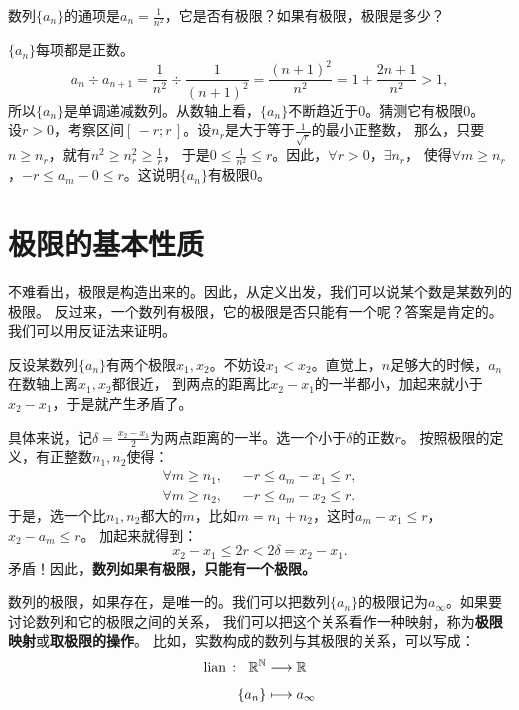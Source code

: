 \documentclass[12pt,UTF8]{ctexbook}
\begin{document}
\begin{et}
数列$\{a_n\}$的通项是$\displaystyle a_n = \frac{1}{n^2}$，它是否有极限？如果有极限，极限是多少？    
\end{et}
\begin{so}
    $\{a_n\}$每项都是正数。
    $$a_{n} \div a_{n+1} = \frac{1}{n^2} \div \frac{1}{(n+1)^2} = \frac{(n+1)^2}{n^2} = 1 + \frac{2n+1}{n^2} > 1,$$
    所以$\{a_n\}$是单调递减数列。从数轴上看，$\{a_n\}$不断趋近于$0$。猜测它有极限$0$。\\
    设$r>0$，考察区间$[\,-r;r\,]$。设$n_r$是大于等于$\frac{1}{\sqrt{r}}$的最小正整数，
    那么，只要$n \geqslant n_r$，就有$n^2 \geqslant n_r^2 \geqslant \frac{1}{r}$，
    于是$0 \leqslant \frac{1}{n^2} \leqslant r$。因此，$\forall r > 0$，$\exists n_r$，
    使得$\forall m \geqslant n_r$，$ -r  \leqslant a_m - 0 \leqslant r$。这说明$\{a_n\}$有极限$0$。    
\end{so}

\section{极限的基本性质}
不难看出，极限是构造出来的。因此，从定义出发，我们可以说某个数是某数列的极限。
反过来，一个数列有极限，它的极限是否只能有一个呢？答案是肯定的。我们可以用反证法来证明。

反设某数列$\{a_n\}$有两个极限$x_1, x_2$。不妨设$x_1 < x_2$。直觉上，$n$足够大的时候，$a_n$在数轴上离$x_1, x_2$都很近，
到两点的距离比$x_2 - x_1$的一半都小，加起来就小于$x_2 - x_1$，于是就产生矛盾了。

具体来说，记$\delta = \frac{x_2 - x_1}{2}$为两点距离的一半。选一个小于$\delta$的正数$r$。
按照极限的定义，有正整数$n_1, n_2$使得：
\begin{align*}
    \forall m \geqslant n_1 , \;\,\,& -r \leqslant a_m - x_1 \leqslant r ,  \\
    \forall m \geqslant n_2 , \;\,\,& -r \leqslant a_m - x_2 \leqslant r .  
\end{align*}
于是，选一个比$n_1,n_2$都大的$m$，比如$m=n_1+n_2$，这时$a_m - x_1 \leqslant r$，$x_2 - a_m \leqslant r$。
加起来就得到：
$$x_2 - x_1 \leqslant 2r < 2\delta = x_2 - x_1.$$
矛盾！因此，\textbf{数列如果有极限，只能有一个极限。}

数列的极限，如果存在，是唯一的。我们可以把数列$\{a_n\}$的极限记为$a_\infty$。如果要讨论数列和它的极限之间的关系，
我们可以把这个关系看作一种映射，称为\textbf{极限映射}或\textbf{取极限的操作}。
比如，实数构成的数列与其极限的关系，可以写成：
\begin{align*}
    \underset{}{\operatorname{lian}\,} : \;\,\, \mathbb{R}^\mathbb{N} &\longrightarrow \mathbb{R}  \\
    \{a_n\} &\longmapsto a_\infty 
\end{align*}
\end{document}
